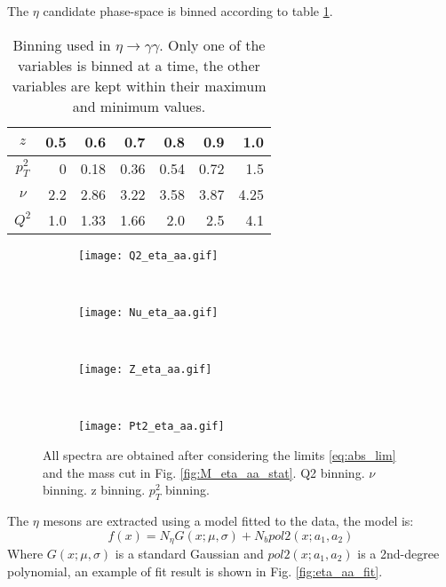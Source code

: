The $\eta$ candidate phase-space is binned according to table \ref{tb:eta_bins}.
\begin{table}[!ht]
\centering
\begin{tabular}{|c|r|r|r|r|r|r|}
\hline
$z$ &0.5& 0.6& 0.7& 0.8 &0.9& 1.0\\ \hline
$p_T^2$ &0 &0.18 &0.36 &0.54 &0.72 &1.5\\ \hline
$\nu$ &2.2 &2.86 &3.22 &3.58 &3.87& 4.25\\ \hline
$Q^2$ &1.0& 1.33 &1.66& 2.0 &2.5 &4.1\\ \hline
\end{tabular}
\caption{Binning used in $\eta \rightarrow \gamma\gamma$. Only one of the variables is binned at a time, the other variables are kept within their maximum and minimum values.}
\label{tb:eta_bins}
\end{table}
%
\begin{figure}[!ht]
\centering
\begin{subfigure}[b]{0.45\textwidth}
\texttt{[image: Q2\_eta\_aa.gif]}
\caption{}
\label{fig:Q2_aa_bins}
\end{subfigure}
~
\begin{subfigure}[b]{0.45\textwidth}
\texttt{[image: Nu\_eta\_aa.gif]}
\caption{}
\label{fig:Nu_aa_bins}
\end{subfigure}
~
\begin{subfigure}[b]{0.45\textwidth}
\texttt{[image: Z\_eta\_aa.gif]}
\caption{}
\label{fig:Z_aa_bins}
\end{subfigure}
~
\begin{subfigure}[b]{0.45\textwidth}
\texttt{[image: Pt2\_eta\_aa.gif]}
\caption{}
\label{fig:Pt2_aa_bins}
\end{subfigure}
\caption{All spectra are obtained after considering the limits \eqref{eq:abs_lim} and the mass cut in Fig. \ref{fig:M_eta_aa_stat}. \protect{} Q2 binning. \protect{} $\nu$ binning. \protect{} z binning. \protect{} $p_T^2$ binning.}
\end{figure}
%
The $\eta$ mesons are extracted using a model fitted to the data, the model is:
\begin{equation}
f(x) = N_{\eta}G(x;\mu,\sigma) + N_b pol2(x;a_1,a_2)
\label{eq:eta_aa_model}
\end{equation}
Where $G(x;\mu,\sigma)$ is a standard Gaussian and $pol2(x;a_1,a_2)$ is a 2nd-degree polynomial, an example of fit result is shown in Fig. \ref{fig:eta_aa_fit}.

